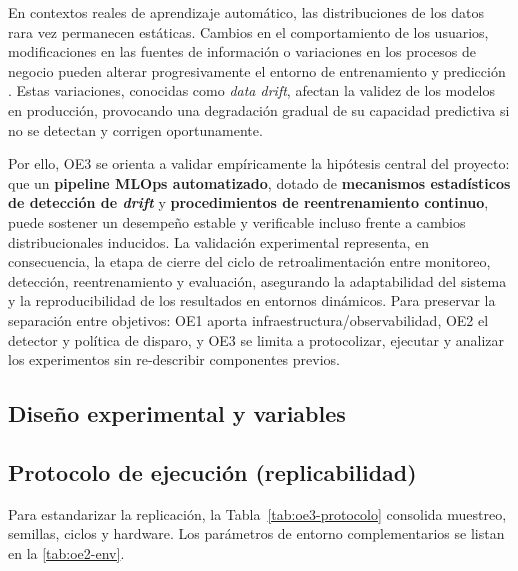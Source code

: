 En contextos reales de aprendizaje automático, las distribuciones de los datos rara vez permanecen estáticas.  
Cambios en el comportamiento de los usuarios, modificaciones en las fuentes de información o variaciones en los procesos de negocio pueden alterar progresivamente el entorno de entrenamiento y predicción \citep{Gama2014,Sethi2017}.  
Estas variaciones, conocidas como \textit{data drift}, afectan la validez de los modelos en producción, provocando una degradación gradual de su capacidad predictiva si no se detectan y corrigen oportunamente.

Por ello, OE3 se orienta a validar empíricamente la hipótesis central del proyecto: que un \textbf{pipeline MLOps automatizado}, dotado de \textbf{mecanismos estadísticos de detección de \textit{drift}} y \textbf{procedimientos de reentrenamiento continuo}, puede sostener un desempeño estable y verificable incluso frente a cambios distribucionales inducidos.  
La validación experimental representa, en consecuencia, la etapa de cierre del ciclo de retroalimentación entre monitoreo, detección, reentrenamiento y evaluación, asegurando la adaptabilidad del sistema y la reproducibilidad de los resultados en entornos dinámicos.
Para preservar la separación entre objetivos: OE1 aporta infraestructura/observabilidad, OE2 el detector y política de disparo, y OE3 se limita a protocolizar, ejecutar y analizar los experimentos sin re-describir componentes previos.

\subsection{Diseño experimental y variables}
\label{subsec:oe3-design}

\subsection*{Protocolo de ejecución (replicabilidad)}
Para estandarizar la replicación, la Tabla~\ref{tab:oe3-protocolo} consolida muestreo, semillas, ciclos y hardware. Los parámetros de entorno complementarios se listan en la \autoref{tab:oe2-env}.

